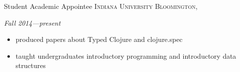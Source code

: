 \documentclass[10pt,a4paper]{article}
\begin{document}


\headedsection
  {{Student Academic Appointee}}
  {\textsc{Indiana University Bloomington, }} {%
    {\textit{Fall 2014---present}}
    {
    \begin{itemize}
      \item produced papers about Typed Clojure and clojure.spec
      \item taught undergraduates introductory programming and introductory data structures
    \end{itemize}
    }
}


%
\end{document}
